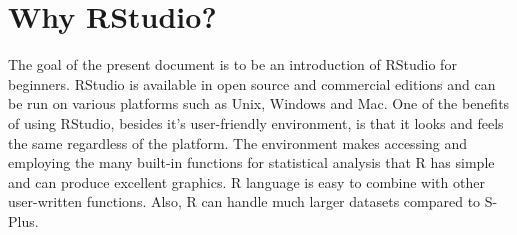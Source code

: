 \documentclass[a4paper]{report}
\begin{document}
    \section{Why RStudio?}
    
        \begin{flushleft}
        The goal of the present document is to be an introduction of RStudio for beginners.  RStudio is available in open source and commercial editions and can be run on various platforms such as Unix, Windows and Mac. One of the benefits of using RStudio, besides it's user-friendly environment, is that it looks and feels the same regardless of the platform. The environment makes accessing and employing the many built-in functions for statistical analysis that R has simple and can produce excellent graphics. R language is easy to combine with other user-written functions. Also, R can handle much larger datasets compared to S-Plus.
        \end{flushleft}
    
    \newpage 
    
\end{document}
